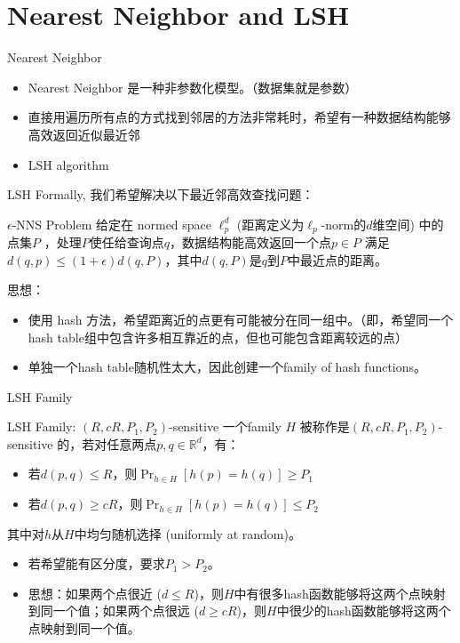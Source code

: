 \section{Nearest Neighbor and LSH}

\begin{frame}{Nearest Neighbor}
\begin{itemize}
    \item Nearest Neighbor 是一种非参数化模型。（数据集就是参数）
    \item 直接用遍历所有点的方式找到邻居的方法非常耗时，希望有一种数据结构能够高效返回近似最近邻
    \item LSH algorithm
\end{itemize}
\end{frame}

\begin{frame}{LSH}
    Formally, 我们希望解决以下最近邻高效查找问题：
    \begin{block}{$\epsilon$-NNS Problem}
        给定在 normed space $\ell_p^{d}$ (距离定义为$\ell_p$-norm的$d$维空间) 中的点集$P$ ，处理$P$使任给查询点$q$，数据结构能高效返回一个点$p \in P$ 满足 $d(q, p) \leqslant (1+\epsilon) d(q, P)$，其中$d(q, P)$是$q$到$P$中最近点的距离。
    \end{block}
    思想：
    \begin{itemize}
        \item 使用 hash 方法，希望距离近的点更有可能被分在同一组中。（即，希望同一个hash table组中包含许多相互靠近的点，但也可能包含距离较远的点）
        \item 单独一个hash table随机性太大，因此创建一个family of hash functions。
    \end{itemize}
\end{frame}

\begin{frame}{LSH Family}
    \begin{block}{LSH Family: $(R, cR, P_1, P_2)$-sensitive}
        一个family $H$ 被称作是$(R, cR, P_1, P_2)$-sensitive 的，若对任意两点$p, q \in \mathbb{R}^{d}$，有：
        \begin{itemize}
            \item 若$d(p, q) \leq R$，则$\Pr_{h \in H}[h(p) = h(q)] \geq P_1$
            \item 若$d(p, q) \geq cR$，则$\Pr_{h \in H}[h(p) = h(q)] \leq P_2$
        \end{itemize}
        其中对$h$从$H$中均匀随机选择 (uniformly at random)。
    \end{block}
    \begin{itemize}
        \item 若希望能有区分度，要求$P_1 > P_2$。
        \item 思想：如果两个点很近 ($d \leqslant R$)，则$H$中有很多hash函数能够将这两个点映射到同一个值；如果两个点很远 ($d \geqslant cR$)，则$H$中很少的hash函数能够将这两个点映射到同一个值。
    \end{itemize}
\end{frame}

